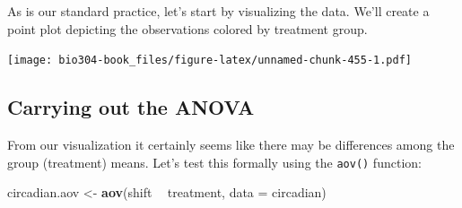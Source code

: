 \documentclass[]{book}
\newenvironment{Shaded}{\begin{snugshade}}{\end{snugshade}}
\newcommand{\CommentTok}[1]{\textcolor[rgb]{0.56,0.35,0.01}{\textit{#1}}}
\newcommand{\DataTypeTok}[1]{\textcolor[rgb]{0.13,0.29,0.53}{#1}}
\newcommand{\DecValTok}[1]{\textcolor[rgb]{0.00,0.00,0.81}{#1}}
\newcommand{\FloatTok}[1]{\textcolor[rgb]{0.00,0.00,0.81}{#1}}
\newcommand{\KeywordTok}[1]{\textcolor[rgb]{0.13,0.29,0.53}{\textbf{#1}}}
\newcommand{\NormalTok}[1]{#1}
\newcommand{\OperatorTok}[1]{\textcolor[rgb]{0.81,0.36,0.00}{\textbf{#1}}}
\newcommand{\StringTok}[1]{\textcolor[rgb]{0.31,0.60,0.02}{#1}}
\theoremstyle{definition}
\theoremstyle{definition}
\theoremstyle{definition}
\theoremstyle{remark}
\begin{document}
As is our standard practice, let's start by visualizing the data. We'll
create a point plot depicting the observations colored by treatment
group.

\begin{Shaded}
\end{Shaded}

\texttt{[image: bio304-book\_files/figure-latex/unnamed-chunk-455-1.pdf]}

\hypertarget{carrying-out-the-anova}{%
\subsection{Carrying out the ANOVA}\label{carrying-out-the-anova}}

From our visualization it certainly seems like there may be differences
among the group (treatment) means. Let's test this formally using the
\texttt{aov()} function:

\begin{Shaded}
\begin{Highlighting}[]
\NormalTok{circadian.aov <-}\StringTok{ }\KeywordTok{aov}\NormalTok{(shift }\OperatorTok{~}\StringTok{ }\NormalTok{treatment, }\DataTypeTok{data =}\NormalTok{ circadian)}
\end{Highlighting}
\end{Shaded}
\end{document}
